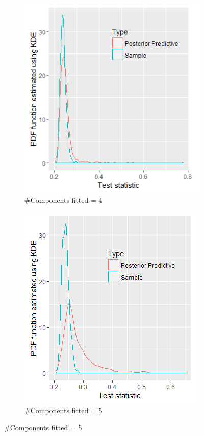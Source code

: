 \begin{figure}[!htb]
\begin{subfigure}[b]{0.4\textwidth}
		\includegraphics[width=\textwidth]{mainmatter/chapter_6_blood_donor/ppc_4comp.png}	
          \caption{\label{fig : ppc_blood_donor_4comp}\#Components fitted = 4}
	\end{subfigure}
	\begin{subfigure}[b]{0.4\textwidth}
		\includegraphics[width=\textwidth]{mainmatter/chapter_6_blood_donor/ppc_5comp.png}	
          \caption{\label{fig : ppc_blood_donor_5comp}\#Components fitted = 5}
	\end{subfigure}
	

\end{figure}

